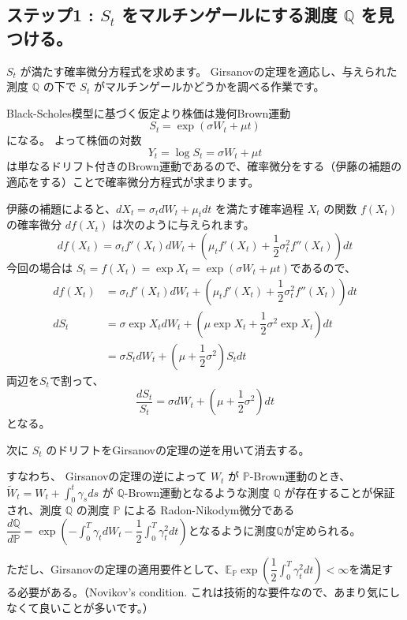 \documentclass[uplatex,a4j,12pt,dvipdfmx]{jsarticle}
\begin{document}
\subsection{ステップ1 : $S_{t}$ をマルチンゲールにする測度 $\mathbb{Q}$ を見つける。}

$S_{t}$ が満たす確率微分方程式を求めます。
Girsanovの定理を適応し、与えられた測度 $\mathbb{Q}$ の下で $S_{t}$ がマルチンゲールかどうかを調べる作業です。

Black-Scholes模型に基づく仮定より株価は幾何Brown運動
$$S_{t} = \exp (\sigma W_{t} + \mu t)$$
になる。
よって株価の対数
$$Y_{t} = \log S_{t} = \sigma W_{t} + \mu t$$
は単なるドリフト付きのBrown運動であるので、確率微分をする（伊藤の補題の適応をする）ことで確率微分方程式が求まります。

伊藤の補題によると、$d X_{t} = \sigma_{t} d W_{t} + \mu_{t} d t$ を満たす確率過程 $X_{t}$ の関数 $f(X_{t})$ の確率微分 $d f(X_{t})$ は次のように与えられます。
$$d f(X_{t}) = \sigma_{t} f ' ( X_{t} ) d W_{t} + \left( \mu_{t} f ' ( X_{t} ) + \dfrac{1}{2} \sigma^{2}_{t} f'' (X_{t}) \right) dt$$
今回の場合は $S_{t} = f(X_{t}) = \exp X_{t} = \exp (\sigma W_{t} + \mu t)$であるので、
\begin{align*}
	d f(X_{t}) & = \sigma_{t} f ' ( X_{t} ) d W_{t} + \left( \mu_{t} f ' ( X_{t} ) + \dfrac{1}{2} \sigma^{2}_{t} f'' (X_{t}) \right) dt \\
	d S_{t}    & = \sigma \exp X_{t} d W_{t} + \left( \mu \exp X_{t} + \dfrac{1}{2} \sigma^{2} \exp X_{t} \right) dt                    \\
	           & = \sigma S_{t} d W_{t} + \left( \mu + \dfrac{1}{2} \sigma^{2} \right) S_{t} dt
\end{align*}
両辺を$S_{t}$で割って、
$$ \dfrac{d S_{t}}{S_{t}} = \sigma d W_{t} + \left( \mu + \dfrac{1}{2} \sigma^{2} \right) dt $$
となる。

次に $S_{t}$ のドリフトをGirsanovの定理の逆を用いて消去する。

すなわち、
Girsanovの定理の逆によって $W_{t}$ が $\mathbb{P}$-Brown運動のとき、$ \displaystyle \tilde{W}_{t} = W_{t} + \int^{t}_{0} \gamma_{s} ds$ が $\mathbb{Q}$-Brown運動となるような測度 $\mathbb{Q}$ が存在することが保証され、測度 $\mathbb{Q}$ の測度 $\mathbb{P}$ による Radon-Nikodym微分である $\dfrac{d \mathbb{Q}}{d \mathbb{P}} = \exp \left( - \int^{T}_{0} \gamma_{t} d W_{t} - \dfrac{1}{2} \int^{T}_{0} \gamma_{t}^{2} dt \right)$となるように測度$\mathbb{Q}$が定められる。

ただし、Girsanovの定理の適用要件として、$\mathbb{E}_{\mathbb{P}} \exp \left( \dfrac{1}{2} \int^{T}_{0} \gamma_{t}^{2} dt \right) < \infty$を満足する必要がある。（Novikov's condition. これは技術的な要件なので、あまり気にしなくて良いことが多いです。）
\end{document}

